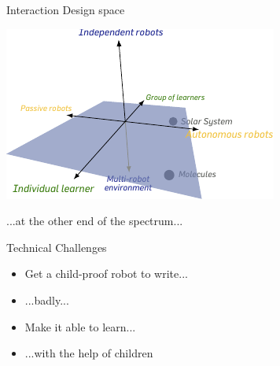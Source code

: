 \documentclass[xcolor=table]{beamer}
\begin{document}





{
 \begin{frame}{Interaction Design space}
     \begin{center}
         \includegraphics[width=0.8\linewidth]{cellulo/interaction-space}
     \end{center}
 \end{frame}
 }


 \begin{frame}[plain]{}
     ...at the other end of the spectrum...
 \end{frame}


\begin{frame}[label=cowriter-impl]{Technical Challenges}
    \begin{itemize}
        \item<1-> Get a child-proof robot to write...
        \item<2-> ...badly...
        \item<3-> Make it able to learn...
        \item<4-> ...with the help of children
    \end{itemize}
\end{frame}
\end{document}

